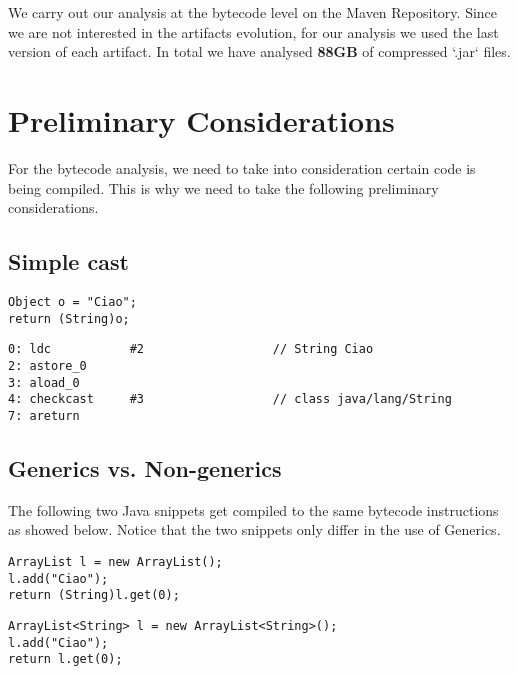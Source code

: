 We carry out our analysis at the bytecode level on the Maven Repository. 
Since we are not interested in the artifacts evolution, 
for our analysis we used the last version of each artifact. 
In total we have analysed \textbf{88GB} of compressed `.jar` files. 

\section{Preliminary Considerations}
\label{sec:org1870116}

For the bytecode analysis, we need to take into consideration certain code is being compiled. 
This is why we need to take the following preliminary considerations. 

\subsection{Simple cast}
\label{sec:org144c36d}

\lstset{language=java,label= ,caption= ,captionpos=b,numbers=none}
\begin{lstlisting}
Object o = "Ciao"; 
return (String)o; 
\end{lstlisting}

\begin{verbatim}
0: ldc           #2                  // String Ciao 
2: astore_0 
3: aload_0 
4: checkcast     #3                  // class java/lang/String 
7: areturn 
\end{verbatim}

\subsection{Generics vs. Non-generics}
\label{sec:org2757057}

The following two Java snippets get compiled to the same bytecode instructions as showed below. 
Notice that the two snippets only differ in the use of Generics. 

\lstset{language=java,label= ,caption= ,captionpos=b,numbers=none}
\begin{lstlisting}
ArrayList l = new ArrayList(); 
l.add("Ciao"); 
return (String)l.get(0); 
\end{lstlisting}

\lstset{language=java,label= ,caption= ,captionpos=b,numbers=none}
\begin{lstlisting}
ArrayList<String> l = new ArrayList<String>(); 
l.add("Ciao"); 
return l.get(0); 
\end{lstlisting}

